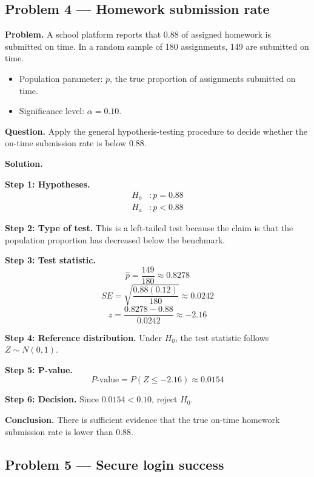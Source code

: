 \begin{ExamProblems}
\subsection*{Problem 4 — Homework submission rate}

\textbf{Problem.} A school platform reports that 0.88 of assigned homework is submitted on time. In a random sample of 180 assignments, 149 are submitted on time.
\begin{itemize}
    \item Population parameter: \(p\), the true proportion of assignments submitted on time.
    \item Significance level: \(\alpha=0.10\).
\end{itemize}

\textbf{Question.} Apply the general hypothesis-testing procedure to decide whether the on-time submission rate is below 0.88.

\textbf{Solution.}

\textbf{Step 1: Hypotheses.}
\[
\begin{aligned}
H_0&: p = 0.88 \\
H_a&: p < 0.88
\end{aligned}
\]

\textbf{Step 2: Type of test.} This is a left-tailed test because the claim is that the population proportion has decreased below the benchmark.

\textbf{Step 3: Test statistic.}
\[
\hat{p}=\frac{149}{180}\approx 0.8278
\]
\[
SE=\sqrt{\frac{0.88(0.12)}{180}}\approx 0.0242
\]
\[
z=\frac{0.8278-0.88}{0.0242}\approx -2.16
\]

\textbf{Step 4: Reference distribution.} Under \(H_0\), the test statistic follows \(Z\sim N(0,1)\).

\textbf{Step 5: P-value.}
\[
P\text{-value}=P(Z\le -2.16)\approx 0.0154
\]

\textbf{Step 6: Decision.} Since \(0.0154<0.10\), reject \(H_0\).

\textbf{Conclusion.} There is sufficient evidence that the true on-time homework submission rate is lower than 0.88.

\hypertarget{c4-ex5}{}
\item
\subsection*{Problem 5 — Secure login success}


\end{ExamProblems}
